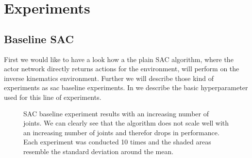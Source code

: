 \chapter{Experiments}\label{chap:experiments}

% 
% 


\section{Baseline SAC}

First we would like to have a look how a the plain SAC algorithm, where the actor network directly returns actions for the environment, will perform on the inverse kinematics environment. Further we will describe those kind of experiments as sac baseline experiments. In  we describe the basic hyperparameter used for this line of experiments.
\begin{figure}
    \begin{center}
        \hfill
    \end{center}
    \caption[SAC baseline experiment results]{SAC baseline experiment results with an increasing number of joints. We can clearly see that the algorithm does not scale well with an increasing number of joints and therefor drops in performance. Each experiment was conducted 10 times and the shaded areas resemble the standard deviation around the mean.}
    \label{fig:SAC_baseline}
\end{figure}

